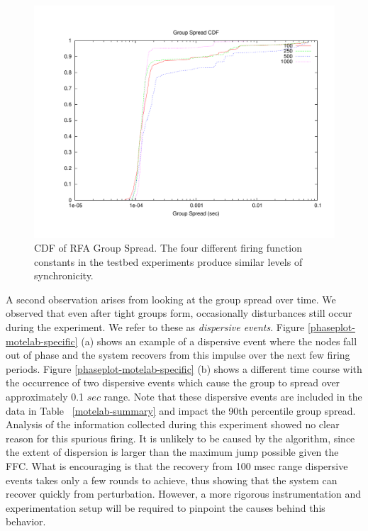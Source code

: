 \documentclass{sig-alternate}
\begin{document}
{\begin{figure}
\begin{center}
\includegraphics[width=0.8\hsize]{./figures/CDFTOT.pdf} 
\end{center} 
\caption{CDF of RFA Group Spread. The four different firing function
constants in the testbed experiments produce similar levels of
synchronicity.}
\label{groupspread-cdf} 
\end{figure} 

A second observation arises from looking at the group spread over
time. We observed that even after tight groups form, occasionally
disturbances still occur during the experiment. We refer to these as
{\em dispersive events}. Figure \ref{phaseplot-motelab-specific} (a)
shows an example of a dispersive event where the nodes fall out of
phase and the system recovers from this impulse over the next few
firing periods. Figure \ref{phaseplot-motelab-specific} (b) shows a
different time course with the occurrence of two dispersive events
which cause the group to spread over approximately 0.1 $sec$
range. Note that these dispersive events are included in the data in
Table ~\ref{motelab-summary} and impact the 90th percentile group
spread. Analysis of the information collected during this experiment
showed no clear reason for this spurious firing. It is unlikely to be
caused by the algorithm, since the extent of dispersion is larger than
the maximum jump possible given the FFC. What is encouraging is that
the recovery from 100 msec range dispersive events takes only a few
rounds to achieve, thus showing that the system can recover quickly
from perturbation. However, a more rigorous instrumentation and
experimentation setup will be required to pinpoint the causes behind
this behavior.

}
\end{document}
